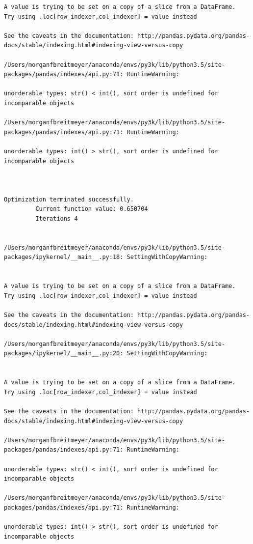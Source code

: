 \begin{lstlisting}
A value is trying to be set on a copy of a slice from a DataFrame.
Try using .loc[row_indexer,col_indexer] = value instead

See the caveats in the documentation: http://pandas.pydata.org/pandas-docs/stable/indexing.html#indexing-view-versus-copy

/Users/morganfbreitmeyer/anaconda/envs/py3k/lib/python3.5/site-packages/pandas/indexes/api.py:71: RuntimeWarning:

unorderable types: str() < int(), sort order is undefined for incomparable objects

/Users/morganfbreitmeyer/anaconda/envs/py3k/lib/python3.5/site-packages/pandas/indexes/api.py:71: RuntimeWarning:

unorderable types: int() > str(), sort order is undefined for incomparable objects



Optimization terminated successfully.
         Current function value: 0.650704
         Iterations 4


/Users/morganfbreitmeyer/anaconda/envs/py3k/lib/python3.5/site-packages/ipykernel/__main__.py:18: SettingWithCopyWarning:


A value is trying to be set on a copy of a slice from a DataFrame.
Try using .loc[row_indexer,col_indexer] = value instead

See the caveats in the documentation: http://pandas.pydata.org/pandas-docs/stable/indexing.html#indexing-view-versus-copy

/Users/morganfbreitmeyer/anaconda/envs/py3k/lib/python3.5/site-packages/ipykernel/__main__.py:20: SettingWithCopyWarning:


A value is trying to be set on a copy of a slice from a DataFrame.
Try using .loc[row_indexer,col_indexer] = value instead

See the caveats in the documentation: http://pandas.pydata.org/pandas-docs/stable/indexing.html#indexing-view-versus-copy

/Users/morganfbreitmeyer/anaconda/envs/py3k/lib/python3.5/site-packages/pandas/indexes/api.py:71: RuntimeWarning:

unorderable types: str() < int(), sort order is undefined for incomparable objects

/Users/morganfbreitmeyer/anaconda/envs/py3k/lib/python3.5/site-packages/pandas/indexes/api.py:71: RuntimeWarning:

unorderable types: int() > str(), sort order is undefined for incomparable objects




\end{lstlisting}
